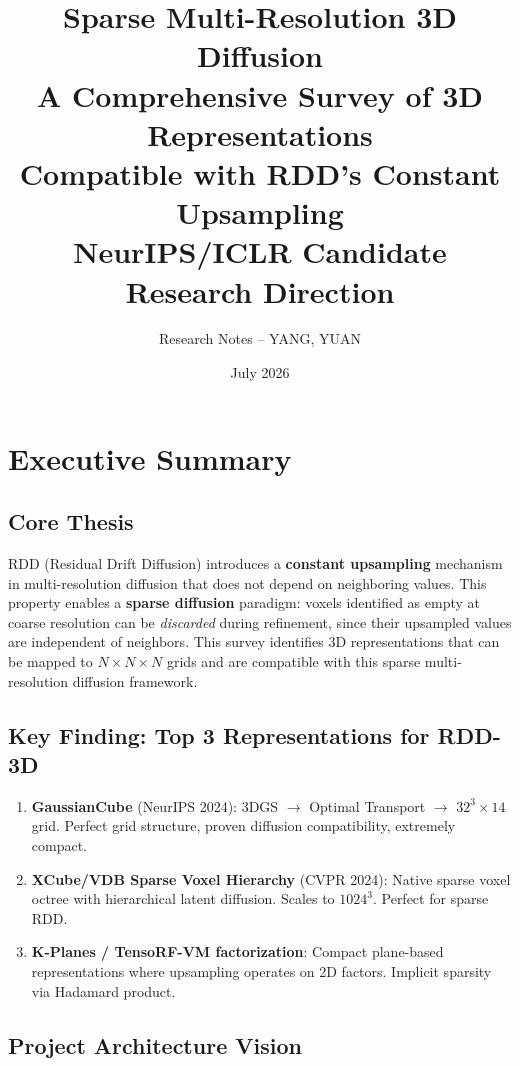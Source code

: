 \documentclass[11pt, a4paper]{article}
\title{\huge Sparse Multi-Resolution 3D Diffusion\\[0.4em]
\Large A Comprehensive Survey of 3D Representations\\Compatible with RDD's Constant Upsampling\\[0.2em]
\normalsize NeurIPS/ICLR Candidate Research Direction}
\author{Research Notes -- YANG, YUAN}
\date{July 2026}
\begin{document}
\maketitle
\tableofcontents
\newpage

\section{Executive Summary}

\subsection{Core Thesis}

RDD (Residual Drift Diffusion) introduces a \textbf{constant upsampling} mechanism in multi-resolution diffusion that does not depend on neighboring values. This property enables a \textbf{sparse diffusion} paradigm: voxels identified as empty at coarse resolution can be \emph{discarded} during refinement, since their upsampled values are independent of neighbors. This survey identifies 3D representations that can be mapped to $N \times N \times N$ grids and are compatible with this sparse multi-resolution diffusion framework.

\subsection{Key Finding: Top 3 Representations for RDD-3D}

\begin{enumerate}
    \item \textbf{GaussianCube} (NeurIPS 2024): 3DGS $\to$ Optimal Transport $\to$ $32^3 \times 14$ grid. Perfect grid structure, proven diffusion compatibility, extremely compact.
    \item \textbf{XCube/VDB Sparse Voxel Hierarchy} (CVPR 2024): Native sparse voxel octree with hierarchical latent diffusion. Scales to $1024^3$. Perfect for sparse RDD.
    \item \textbf{K-Planes / TensoRF-VM factorization}: Compact plane-based representations where upsampling operates on 2D factors. Implicit sparsity via Hadamard product.
\end{enumerate}

\subsection{Project Architecture Vision}
\end{document}
